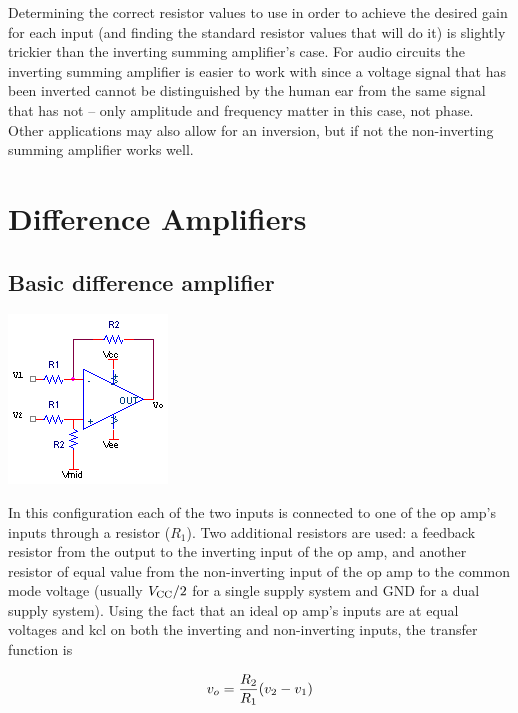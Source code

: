 Determining the correct resistor values to use in order to achieve the desired gain for each input (and finding the standard resistor values that will do it) is slightly trickier than the inverting summing amplifier's case.
For audio circuits the inverting summing amplifier is easier to work with since a voltage signal that has been inverted cannot be distinguished by the human ear from the same signal that has not -- only amplitude and frequency matter in this case, not phase.
Other applications may also allow for an inversion, but if not the non-inverting summing amplifier works well.

\section{Difference Amplifiers}

\subsection{Basic difference amplifier}
\begin{center}
	\includegraphics{schematics/differenceamp.PNG}
\end{center}
In this configuration each of the two inputs is connected to one of the op amp's inputs through a resistor ($R_1$).
Two additional resistors are used:
a feedback resistor from the output to the inverting input of the op amp, and another resistor of equal value from the non-inverting input of the op amp to the common mode voltage (usually $V_\mathrm{CC}/2$ for a single supply system and GND for a dual supply system).
Using the fact that an ideal op amp's inputs are at equal voltages and \ac{kcl} on both the inverting and non-inverting inputs, the transfer function is

\textcolor{red}{
\begin{equation}
\vout = \frac{R_2}{R_1}(v_2 - v_1)
\label{eq:differenceamp}
\end{equation}
}

